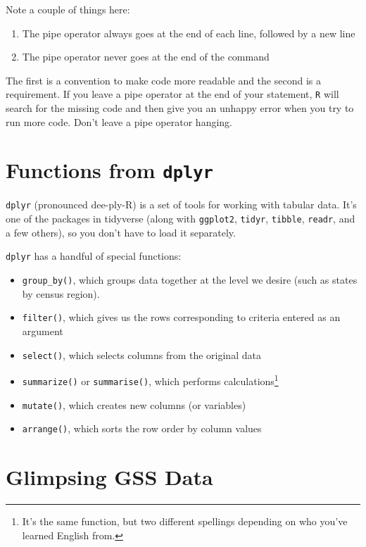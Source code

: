 \documentclass[
]{book}
\begin{document}
Note a couple of things here:

\begin{enumerate}
\def\labelenumi{\arabic{enumi}.}
\item
  The pipe operator always goes at the end of each line, followed by a new line
\item
  The pipe operator never goes at the end of the command
\end{enumerate}

The first is a convention to make code more readable and the second is a requirement. If you leave a pipe operator at the end of your statement, \texttt{R} will search for the missing code and then give you an unhappy error when you try to run more code. Don't leave a pipe operator hanging.

\hypertarget{functions-from-dplyr}{%
\section{\texorpdfstring{Functions from \texttt{dplyr}}{Functions from dplyr}}\label{functions-from-dplyr}}

\texttt{dplyr} (pronounced dee-ply-R) is a set of tools for working with tabular data. It's one of the packages in tidyverse (along with \texttt{ggplot2}, \texttt{tidyr}, \texttt{tibble}, \texttt{readr}, and a few others), so you don't have to load it separately.

\texttt{dplyr} has a handful of special functions:

\begin{itemize}
\item
  \texttt{group\_by()}, which groups data together at the level we desire (such as states by census region).
\item
  \texttt{filter()}, which gives us the rows corresponding to criteria entered as an argument
\item
  \texttt{select()}, which selects columns from the original data
\item
  \texttt{summarize()} or \texttt{summarise()}, which performs calculations\footnote{It's the same function, but two different spellings depending on who you've learned English from.}
\item
  \texttt{mutate()}, which creates new columns (or variables)
\item
  \texttt{arrange()}, which sorts the row order by column values
\end{itemize}

\hypertarget{glimpsing-gss-data}{%
\section{Glimpsing GSS Data}\label{glimpsing-gss-data}}
\end{document}
